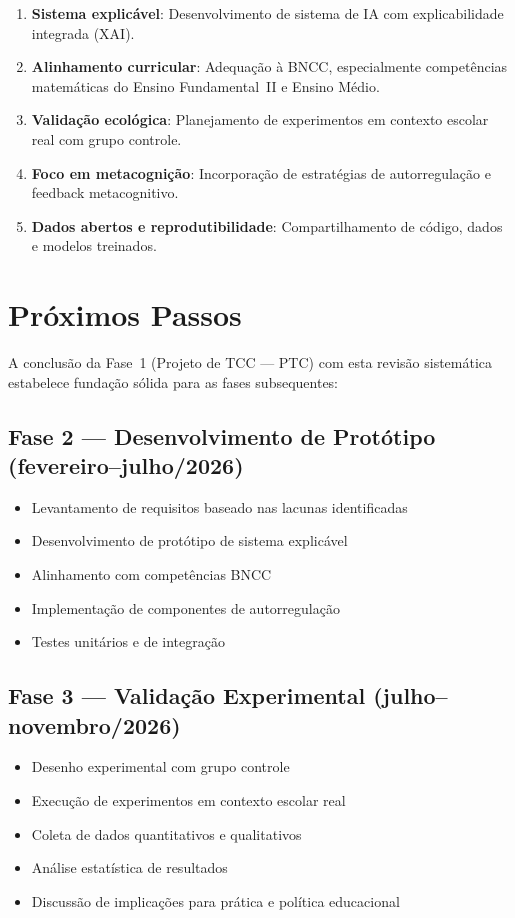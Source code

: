 \begin{enumerate}
    \item \textbf{Sistema explicável}: Desenvolvimento de sistema de IA com 
    explicabilidade integrada (XAI).
    \item \textbf{Alinhamento curricular}: Adequação à BNCC, especialmente 
    competências matemáticas do Ensino Fundamental~II e Ensino Médio.
    \item \textbf{Validação ecológica}: Planejamento de experimentos em contexto 
    escolar real com grupo controle.
    \item \textbf{Foco em metacognição}: Incorporação de estratégias de autorregulação 
    e feedback metacognitivo.
    \item \textbf{Dados abertos e reprodutibilidade}: Compartilhamento de código, 
    dados e modelos treinados.
\end{enumerate}

\section{Próximos Passos}

A conclusão da Fase~1 (Projeto de TCC --- PTC) com esta revisão sistemática estabelece 
fundação sólida para as fases subsequentes:

\subsection{Fase 2 --- Desenvolvimento de Protótipo (fevereiro--julho/2026)}

\begin{itemize}
    \item Levantamento de requisitos baseado nas lacunas identificadas
    \item Desenvolvimento de protótipo de sistema explicável
    \item Alinhamento com competências BNCC
    \item Implementação de componentes de autorregulação
    \item Testes unitários e de integração
\end{itemize}

\subsection{Fase 3 --- Validação Experimental (julho--novembro/2026)}

\begin{itemize}
    \item Desenho experimental com grupo controle
    \item Execução de experimentos em contexto escolar real
    \item Coleta de dados quantitativos e qualitativos
    \item Análise estatística de resultados
    \item Discussão de implicações para prática e política educacional
\end{itemize}

